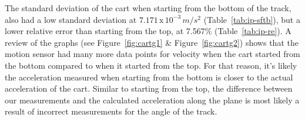 The standard deviation of the cart when starting from the bottom of the track, also had a low standard deviation at $7.171\,\text{x}\,10^{-3}\,m/s^2$ (Table~\ref{tab:ip-sftb}), but a lower relative error than starting from the top, at 7.567\% (Table~\ref{tab:ip-re}). A review of the graphs (see Figure~\ref{fig:cartg1} \& Figure~\ref{fig:cartg2}) shows that the motion sensor had many more data points for velocity when the cart started from the bottom compared to when it started from the top. For that reason, it's likely the acceleration measured when starting from the bottom is closer to the actual acceleration of the cart. Similar to starting from the top, the difference between our measurements and the calculated acceleration along the plane is most likely a result of incorrect measurements for the angle of the track. \par

